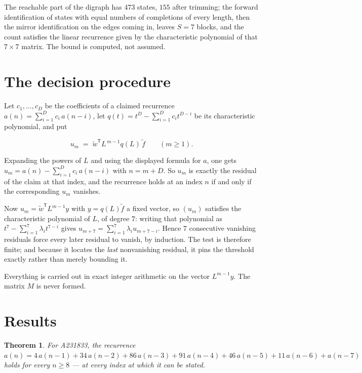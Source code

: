 \documentclass[11pt]{article}
\newtheorem{theorem}{Theorem}
\theoremstyle{definition}
\begin{document}
The reachable part of the digraph has $473$ states, $155$ after trimming; the forward identification of states with equal numbers of completions of every length, then the mirror identification on the edges coming in, leaves $S = 7$ blocks, and the count satisfies the linear recurrence given by the characteristic polynomial of that $7\times7$ matrix. The bound is computed, not assumed.

\section{The decision procedure}

Let $c_1,\dots,c_D$ be the coefficients of a claimed recurrence $a(n) = \sum_{i=1}^{D} c_i\,a(n-i)$, let $q(t) = t^{D} - \sum_{i=1}^{D} c_i t^{D-i}$ be its characteristic polynomial, and put

\[u_m \;=\; \tilde w^{\mathsf T} L^{\,m-1} q(L)\,\tilde f \qquad (m \ge 1).\]

Expanding the powers of $L$ and using the displayed formula for $a$, one gets $u_m = a(n) - \sum_{i=1}^{D} c_i\,a(n-i)$ with $n = m + D$. So $u_m$ is exactly the residual of the claim at that index, and the recurrence holds at an index $n$ if and only if the corresponding $u_m$ vanishes.

Now $u_m = \tilde w^{\mathsf T} L^{m-1} y$ with $y = q(L)\tilde f$ a fixed vector, so $(u_m)$ satisfies the characteristic polynomial of $L$, of degree $7$: writing that polynomial as $t^{7} - \sum_{i=1}^{7} \lambda_i t^{7-i}$ gives $u_{m+7} = \sum_{i=1}^{7} \lambda_i u_{m+7-i}$. Hence $7$ consecutive vanishing residuals force every later residual to vanish, by induction. The test is therefore finite; and because it locates the {\itshape last} nonvanishing residual, it pins the threshold exactly rather than merely bounding it.

Everything is carried out in exact integer arithmetic on the vector $L^{m-1}y$. The matrix $M$ is never formed.

\section{Results}

\begin{theorem} For A231833, the recurrence $a(n) = 4\,a(n-1) + 34\,a(n-2) + 86\,a(n-3) + 91\,a(n-4) + 46\,a(n-5) + 11\,a(n-6) + a(n-7)$ holds for every $n \ge 8$ --- at every index at which it can be stated.\end{theorem}
\end{document}
